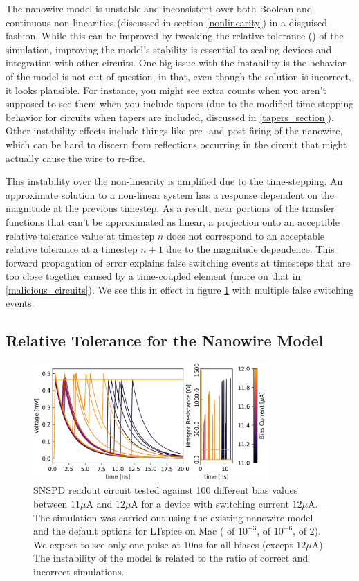 The nanowire model is unstable and inconsistent over both Boolean and continuous non-linearities (discussed in section \ref{nonlinearity}) in a disguised 
fashion. While this can be improved by tweaking the relative tolerance () 
of the simulation, improving the model's stability is essential to scaling devices and integration 
with other circuits.
One big issue with the instability is the behavior of the model is not out of question, in that,
even though the solution is incorrect, it looks plausible. For instance, you might see extra counts
when you aren't supposed to see them when you include tapers (due to the modified time-stepping behavior
for circuits when tapers are included, discussed in \ref{tapers_section}). Other instability effects
include things like pre- and post-firing of the nanowire, which can be hard to discern from reflections
occurring in the circuit that might actually cause the wire to re-fire.

This instability over the non-linearity is amplified due to the time-stepping. An approximate 
solution to a non-linear system has a response dependent on the magnitude at the previous timestep. 
As a result,
near portions of the transfer functions that can't be approximated as linear, a projection
onto an acceptible relative tolerance value at timestep $n$ does not correspond to an
acceptable relative tolerance at a timestep $n+1$ due to the magnitude dependence.
This forward propagation of error explains false switching events at timesteps that
are too close together caused by a time-coupled element (more on that in \ref{malicious_circuits}).
We see this in effect in figure \ref{fig:sweepbias} with multiple false switching events.

\subsection{Relative Tolerance for the Nanowire Model} \label{reltol}

\begin{figure}
    \centering
    \includegraphics[width=0.8\textwidth]{figs/jumbled_mess_new.png}
    \caption{SNSPD readout circuit tested against 100 different bias values between
    $11\mu$A and $12\mu$A for a device with switching current $12\mu$A. The simulation
    was carried out using the existing nanowire model and the default options for LTspice
    on Mac ( of $10^{-3}$,  of $10^{-6}$,  of $2$). 
    We expect to see only
    one pulse at $10$ns for all biases (except $12\mu$A). The instability of the model is
    related to the ratio of correct and incorrect simulations.}
    \label{fig:sweepbias}
\end{figure}

